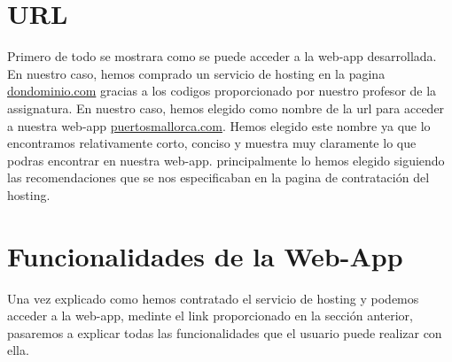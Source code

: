 \documentclass{article}
\begin{document}
\section{URL}
Primero de todo se mostrara como se puede acceder a la web-app desarrollada. En nuestro caso, hemos comprado un servicio de hosting en la pagina \href{https://www.dondominio.com/es/}{dondominio.com} gracias a los codigos proporcionado por nuestro profesor de la assignatura. En nuestro caso, hemos elegido como nombre de la url para acceder a nuestra web-app \href{http://www.puertosmallorca.com/}{puertosmallorca.com}. Hemos elegido este nombre ya que lo encontramos relativamente corto, conciso y muestra muy claramente lo que podras encontrar en nuestra web-app. principalmente lo hemos elegido siguiendo las recomendaciones que se nos especificaban en la pagina de contratación del hosting.

\section{Funcionalidades de la Web-App}
Una vez explicado como hemos contratado el servicio de hosting y podemos acceder a la web-app, medinte el link proporcionado en la sección anterior, pasaremos a explicar todas las funcionalidades que el usuario puede realizar con ella.
\end{document}
